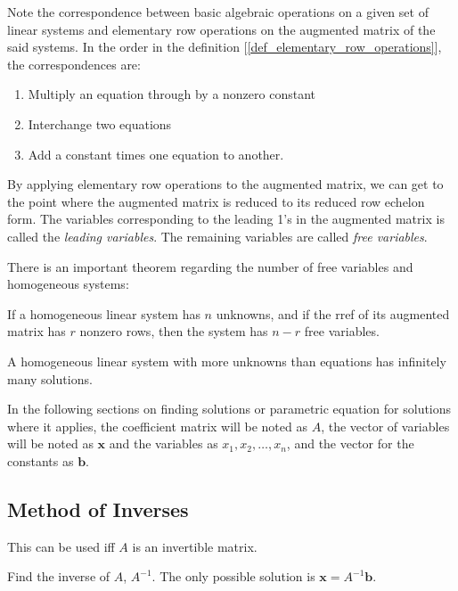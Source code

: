 \documentclass{report}
\begin{document}
		Note the correspondence between basic algebraic operations on a given set of linear systems and elementary row operations on the augmented matrix of the said systems. In the order in the definition [\ref{def_elementary_row_operations}], the correspondences are:
		
		\begin{enumerate}
			\item Multiply an equation through by a nonzero constant
			\item Interchange two equations	
			\item Add a constant times one equation to another.
		\end{enumerate}
		
		By applying elementary row operations to the augmented matrix, we can get to the point where the augmented matrix is reduced to its reduced row echelon form. The variables corresponding to the leading 1's in the augmented matrix is called the \emph{leading variables}. The remaining variables are called \emph{free variables}.
		
		There is an important theorem regarding the number of free variables and homogeneous systems:
		
		\begin{thm}
			If a homogeneous linear system has $n$ unknowns, and if the rref of its augmented matrix has $r$ nonzero rows, then the system has $n-r$ free variables.
		\end{thm}
		
		\begin{coro}
			A homogeneous linear system with more unknowns than equations has infinitely many solutions.
		\end{coro}
		
		In the following sections on finding solutions or parametric equation for solutions where it applies, the coefficient matrix will be noted as $A$, the vector of variables will be noted as $\bm{x}$ and the variables as $x_1, x_2, \dots, x_n$, and the vector for the constants as $\bm{b}$.
		
		\subsection{Method of Inverses}
		
		This can be used iff $A$ is an invertible matrix.
		
		Find the inverse of $A$, $A^{-1}$.
		The only possible solution is $\bm{x}=A^{-1}\bm{b}$.
		
\end{document}
